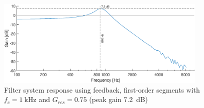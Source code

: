 \documentclass[a4paper, 12pt]{article}
\begin{document}
\begin{figure}
	\centering
	\includegraphics[width=0.9\textwidth]{feedback-response.eps}
	\caption{Filter system response using feedback, first-order segments with $f_c = \SI{1}{\kilo\hertz}$ and $G_{res}=0.75$ (peak gain \SI{7.2}{\deci\bel})}
	\label{fig:feedback-response}
\end{figure}


\clearpage
\sloppy
\printbibliography
\end{document}
